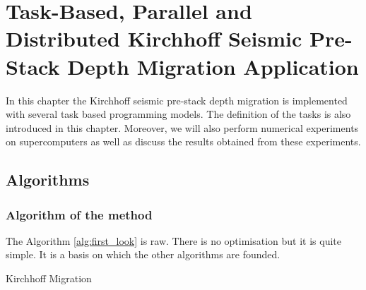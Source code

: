 \chapter{Task-Based, Parallel and Distributed Kirchhoff Seismic Pre-Stack Depth Migration Application \label{chap:exp_km}}
\graphicspath{{chapters/exp_kirchhoff/}}


In this chapter the Kirchhoff seismic pre-stack depth migration is implemented with several task based programming models.
The definition of the tasks is also introduced in this chapter.
Moreover, we will also perform numerical experiments on supercomputers as well as discuss the results obtained from these experiments.

\section{Algorithms}

\subsection{Algorithm of the method}

The Algorithm \ref{alg:first_look} is raw.
There is no optimisation but it is quite simple.
It is a basis on which the other algorithms are founded.

\begin{algorithm}[h]
	\DontPrintSemicolon
	\SetAlgoVlined
	\caption{Kirchhoff Migration \label{alg:first_look}}
\end{algorithm}

